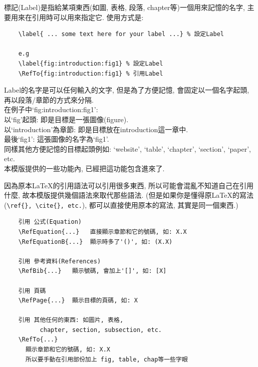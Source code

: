 標記(Label)是指給某項東西(如圖, 表格, 段落, chapter等)一個用來記憶的名字, 主要用來在引用時可以用來指定它. 使用方式是:\\

  \begin{DescriptionFrame}
  \begin{verbatim}
    \label{ ... some text here for your label ...} % 設定Label

    e.g
    \label{fig:introduction:fig1} % 設定Label
    \RefTo{fig:introduction:fig1} % 引用Label
  \end{verbatim}
  \end{DescriptionFrame}

\noindent Label的名字是可以任何輸入的文字, 但是為了方便記憶, 會固定以一個名字起頭, 再以段落/章節的方式來分隔.\\

\noindent 在例子中`fig:introduction:fig1':\\
以`fig'起頭: 即是目標是一張圖像(figure).\\
以`introduction'為章節: 即是目標放在introduction這一章中.\\
最後`fig1': 這張圖像的名字為`fig1'.\\

\noindent 同樣其他方便記憶的目標起頭例如: `website', `table', `chapter', `section', `paper', etc.\\

\noindent 本模版提供的一些功能內, 已經把這功能包含進來了.

\newpage
{}
因為原本LaTeX的引用語法可以引用很多東西, 所以可能會混亂不知道自己在引用什麼, 故本模版提供幾個語法來取代那些語法. (但是如果你是懂得原LaTeX的寫法(\verb|\ref{}, \cite{}, etc.|), 都可以直接使用原本的寫法, 其實是同一個東西.)\\

  \begin{DescriptionFrame}
  \begin{verbatim}
    引用 公式(Equation)
    \RefEquation{...}   直接顯示章節和它的號碼, 如: X.X
    \RefEquationB{...}  顯示時多了'()', 如: (X.X)

    引用 參考資料(References)
    \RefBib{...}   顯示號碼, 會加上'[]', 如: [X]

    引用 頁碼
    \RefPage{...}  顯示目標的頁碼, 如: X

    引用 其他任何的東西: 如圖片, 表格,
          chapter, section, subsection, etc.
    \RefTo{...}
      顯示章節和它的號碼, 如: X.X
      所以要手動在引用部份加上 fig, table, chap等一些字眼
  \end{verbatim}
  \end{DescriptionFrame}

